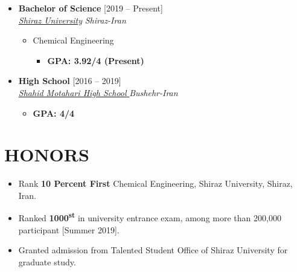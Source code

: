 \documentclass[10pt,a4paper,sans]{moderncv} %
\begin{document}
	\begin{itemize}

		\item \textbf{Bachelor of Science} \hfill [2019 -- Present] \\
		\href{https://cpe.shirazu.ac.ir/}{ \emph{Shiraz University}} \hfill \emph{Shiraz-Iran}
		
		\begin{itemize}
			\item Chemical Engineering
			\begin{itemize}		
				 
				   
				\item\textbf{GPA: 3.92/4 (Present)}
			\end{itemize}
		\end{itemize}
		
		
		\vspace{0.71 em}
		
		\item \textbf{High School} \hfill [2016 -- 2019] \\
		\href{}{ \emph{Shahid Motahari High School }} \hfill \emph{Bushehr-Iran}
		
		\begin{itemize}
			\begin{itemize}		
				
				\item\textbf{GPA: 4/4}
			\end{itemize}
		\end{itemize}
		
		
		
		
	\end{itemize}
	
	\vspace{-0.9em}
	\section{HONORS}
	
	\begin{itemize}
		\item  Rank \textbf{10 Percent First} Chemical Engineering,
		Shiraz University, Shiraz, Iran.
		\item Ranked \textbf {1000\textsuperscript{st} } in university entrance exam, among more than 200,000
		participant [Summer 2019].
		
		\item Granted admission from Talented Student Office of Shiraz University for graduate study. 
		
		
	\end{itemize}
	
\end{document}
